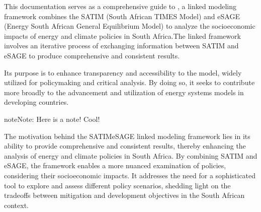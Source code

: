 \documentclass[letterpaper,10pt,english]{jupyterBook}
\begin{document}
\begin{DUlineblock}{0em}
\item[] 
\end{DUlineblock}

\begin{DUlineblock}{0em}
\item[] 
\end{DUlineblock}

\sphinxAtStartPar
This documentation serves as a comprehensive guide to , a  linked modeling framework combines the SATIM (South African TIMES Model) and eSAGE (Energy South African General Equilibrium Model) to analyze the socioeconomic impacts of energy and climate policies in South Africa.The linked framework involves an iterative process of exchanging information between SATIM and eSAGE to produce comprehensive and consistent results.

\sphinxAtStartPar
Its purpose is to enhance transparency and accessibility to the model, widely utilized for policymaking and critical analysis. By doing so, it seeks to contribute more broadly to the advancement and utilization of energy systems models in developing countries.

\begin{sphinxadmonition}{note}{Note:}
\sphinxAtStartPar
Here is a note! Cool!
\end{sphinxadmonition}

\begin{DUlineblock}{0em}
\item[] 
\end{DUlineblock}

\sphinxAtStartPar
The motivation behind the SATIM\sphinxhyphen{}eSAGE linked modeling framework lies in its ability to provide comprehensive and consistent results, thereby enhancing the analysis of energy and climate policies in South Africa. By combining SATIM and eSAGE, the framework enables a more nuanced examination of policies, considering their socioeconomic impacts. It addresses the need for a sophisticated tool to explore and assess different policy scenarios, shedding light on the trade\sphinxhyphen{}offs between mitigation and development objectives in the South African context.

\begin{DUlineblock}{0em}
\item[] 
\end{DUlineblock}
\end{document}
